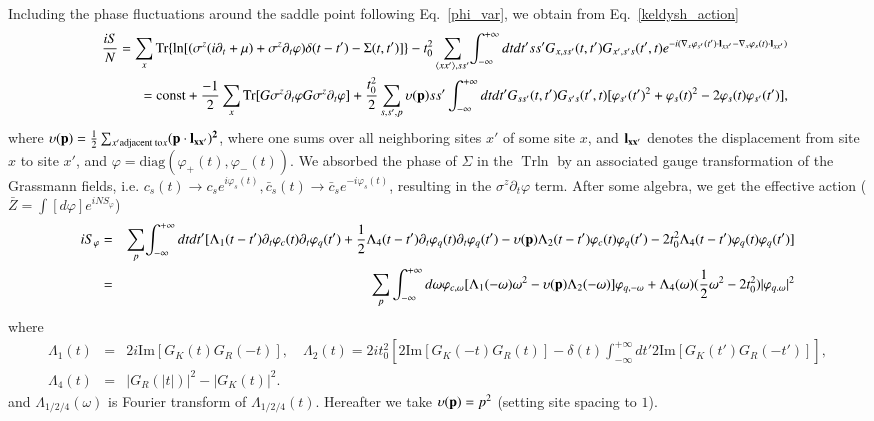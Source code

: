 \documentclass[twocolumn,floatfix,superscriptaddress]{revtex4-1}
\newcommand{\ket}{\rangle}
\newcommand{\bra}{\langle}
\begin{document}
\begin{widetext}
Including the phase fluctuations around the saddle point following Eq.~\eqref{phi_var}, we obtain from Eq.~\eqref{keldysh_action}
\begin{eqnarray}
\label{kel_action}
&&\frac{iS}{N}=\sum_x\text{Tr}\{\ln[(\sigma^z (i\partial_t+\mu)+\sigma^z \partial_t \varphi)\delta(t-t')-\Sigma(t,t')]\}-t_0^2\sum_{\bra xx'\ket,ss'}\!\int_{-\infty}^{+\infty} dt dt'ss' G_{x,ss'}(t,t') G_{x',s's}(t',t)e^{-i(\nabla_x \varphi_{s'}(t')\cdot {\bf l}_{xx'}-\nabla_x\varphi_s(t)\cdot{\bf l}_{xx'})}\nonumber\\
&&=\text{const}+\frac{-1}{2}\sum_x\text{Tr}[G\sigma^z \partial_t \varphi G\sigma^z \partial_t \varphi]+\frac{t_0^2}{2}\sum_{s,s',p}\upsilon({\bf p})ss'\int _{-\infty}^{+\infty}dt dt' G_{ss'}(t,t')G_{s's}(t',t)[\varphi_{s'}(t')^2+\varphi_{s}(t)^2-2\varphi_s(t)\varphi_{s'}(t')],
\end{eqnarray}
where $\upsilon ({\bf p})=\frac{1}{2}\sum_{x' \text{adjacent to}x}(\bf p\cdot \bf l_{xx'})^2$, where one sums over all neighboring sites $x'$ of some site $x$, and $\bf l_{xx'}$ denotes the displacement from site $x$ to site $x'$, and $\varphi=\text{diag}(\varphi_+(t),\varphi_-(t))$.   We absorbed the phase of $\Sigma$ in the $\text{Tr}\ln$ by an associated gauge transformation of the Grassmann fields, i.e. $c_s(t)\rightarrow c_s e^{i\varphi_s(t)},\bar c_s(t)\rightarrow\bar c_s e^{-i\varphi_s(t)}$, resulting in the $\sigma^z \partial_t \varphi$ term. After some algebra, we get the effective action  ($\bar Z=\int [d \varphi]e^{iNS_\varphi}$)
\begin{eqnarray}
\label{phi_action1}
iS_{\varphi}&=&\sum_p\!\int_{-\infty}^{+\infty} dt dt' [\Lambda_1(t-t')\partial_t \varphi_c(t)\partial_t \varphi_q(t')+\frac{1}{2}\Lambda_4(t-t') \partial_t \varphi_q(t)\partial_t \varphi_q(t')
-\upsilon ({\bf p})\Lambda_2(t-t')\varphi_c(t)\varphi_q(t')-2t_0^2 \Lambda_4(t-t')\varphi_q(t)\varphi_q(t')]\nonumber\\
&=&\sum_p\int_{-\infty}^{+\infty} d\omega \varphi_{c,\omega}[\Lambda_1(-\omega)\omega^2-\upsilon ({\bf p}) \Lambda_2(-\omega)]\varphi_{q,-\omega}+\Lambda_4(\omega)(\frac{1}{2}\omega^2-2t_0^2)|\varphi_{q.\omega}|^2
\end{eqnarray}
where
\begin{eqnarray}
\Lambda_1(t)&=&2i\text{Im}[G_K(t)G_R(-t)],\quad \Lambda_2(t)=2it_0^2[2\text{Im}[G_K(-t)G_R(t)]
-\delta(t)\int_{-\infty}^{+\infty} dt'2\text{Im}[G_K(t')G_R(-t')]],\nonumber\\
\Lambda_4(t)&=& |G_R(|t|)|^2-|G_K(t)|^2.
\end{eqnarray}
and $\Lambda_{1/2/4}(\omega)$ is Fourier transform of $\Lambda_{1/2/4}(t)$.  Hereafter we take $\upsilon({\bf p})=p^2$ (setting site spacing to $1$). %


\end{widetext}
\end{document}
